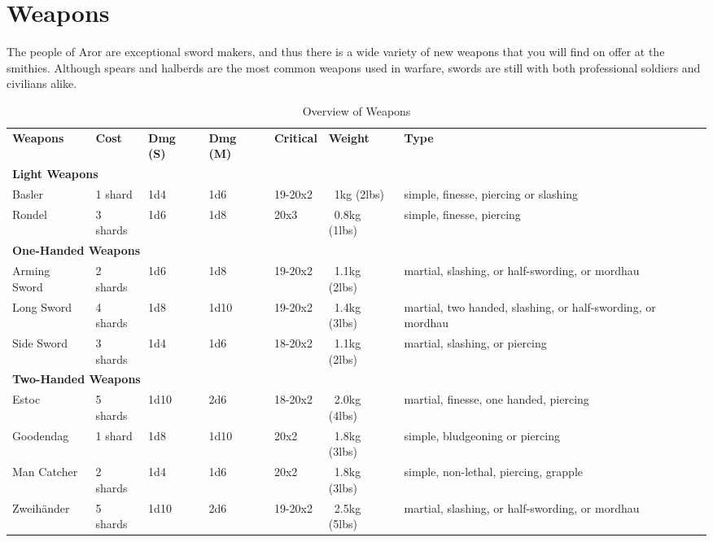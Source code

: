 \section{Weapons}
\label{sec:Weapons}

The people of Aror are exceptional sword makers, and thus there is a wide
variety of new weapons that you will find on offer at the smithies. Although
spears and halberds are the most common weapons used in warfare, swords are
still with both professional soldiers and civilians alike.

\begin{table*}[!htb]
  \small
  \caption{Overview of Weapons}
  \begin{tabular}{p{2.5cm}     l               p{1cm}             p{1cm}             p{1.5cm}            p{2cm}          p{3.0cm}}
    \textbf{Weapons} & \textbf{Cost} & \textbf{Dmg (S)} & \textbf{Dmg (M)} & \textbf{Critical} & \textbf{Weight} & \textbf{Type} \\
    \multicolumn{7}{l}{\textbf{Light Weapons}} \\
    Basler       & 1 shard  & 1d4  & 1d6  & 19-20x2 & ~1kg (2lbs)   & simple, finesse, piercing or slashing \\
    Rondel       & 3 shards & 1d6  & 1d8  &    20x3 & ~0.8kg (1lbs) & simple, finesse, piercing \\
    \multicolumn{7}{l}{\textbf{One-Handed Weapons}} \\
    Arming Sword & 2 shards & 1d6  & 1d8  & 19-20x2 & ~1.1kg (2lbs) & martial, slashing, or half-swording, or mordhau \\
    Long Sword   & 4 shards & 1d8  & 1d10 & 19-20x2 & ~1.4kg (3lbs) & martial, two handed, slashing, or half-swording, or mordhau \\
    Side Sword   & 3 shards & 1d4  & 1d6  & 18-20x2 & ~1.1kg (2lbs) & martial, slashing, or piercing \\
    \multicolumn{7}{l}{\textbf{Two-Handed Weapons}} \\
    Estoc        & 5 shards & 1d10 & 2d6  & 18-20x2 & ~2.0kg (4lbs) & martial, finesse, one handed, piercing \\
    Goodendag    & 1 shard  & 1d8  & 1d10 & 20x2    & ~1.8kg (3lbs) & simple, bludgeoning or piercing \\
    Man Catcher  & 2 shards & 1d4  & 1d6  & 20x2    & ~1.8kg (3lbs) & simple, non-lethal, piercing, grapple \\
    Zweihänder   & 5 shards & 1d10 & 2d6  & 19-20x2 & ~2.5kg (5lbs) & martial, slashing, or half-swording, or mordhau \\
  \end{tabular}
\end{table*}

